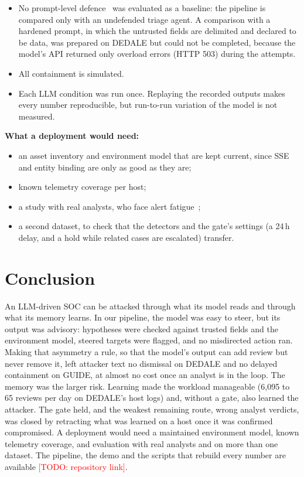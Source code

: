 \documentclass[conference]{IEEEtran}
\newcommand{\todo}[1]{\textcolor{red}{[TODO: #1]}}
\begin{document}
\begin{itemize}
escalation.
\item No prompt-level defence~\cite{spotlighting,struq} was evaluated as a baseline: the pipeline is compared only
with an undefended triage agent. A comparison with a hardened prompt, in which the untrusted fields are delimited
and declared to be data, was prepared on DEDALE but could not be completed, because the model's API returned only
overload errors (HTTP 503) during the attempts.
\item All containment is simulated.
\item Each LLM condition was run once. Replaying the recorded outputs makes every number reproducible, but
run-to-run variation of the model is not measured.
\end{itemize}

\textbf{What a deployment would need:}
\begin{itemize}
\item an asset inventory and environment model that are kept current, since SSE and entity binding are only as good
as they are;
\item known telemetry coverage per host;
\item a study with real analysts, who face alert fatigue~\cite{alahmadi};
\item a second dataset, to check that the detectors and the gate's settings (a 24\,h delay, and a hold while
related cases are escalated) transfer.
\end{itemize}

\section{Conclusion}
An LLM-driven SOC can be attacked through what its model reads and through what its memory learns. In our
pipeline, the model was easy to steer, but its output was advisory: hypotheses were checked against trusted fields
and the environment model, steered targets were flagged, and no misdirected action ran. Making that asymmetry a
rule, so that the model's output can add review but never remove it, left attacker text no dismissal on DEDALE and
no delayed containment on GUIDE, at almost no cost once an analyst is in the loop. The memory was the larger
risk. Learning made the workload manageable (6,095 to 65 reviews per day on DEDALE's host logs) and, without a
gate, also learned the attacker. The gate held, and the weakest remaining route, wrong analyst verdicts, was closed
by retracting what was learned on a host once it was confirmed compromised. A deployment would need a maintained
environment model, known telemetry coverage, and evaluation with real analysts and on more than one dataset.
The pipeline, the demo and the scripts that rebuild every number are available \todo{repository link}.
\end{document}

